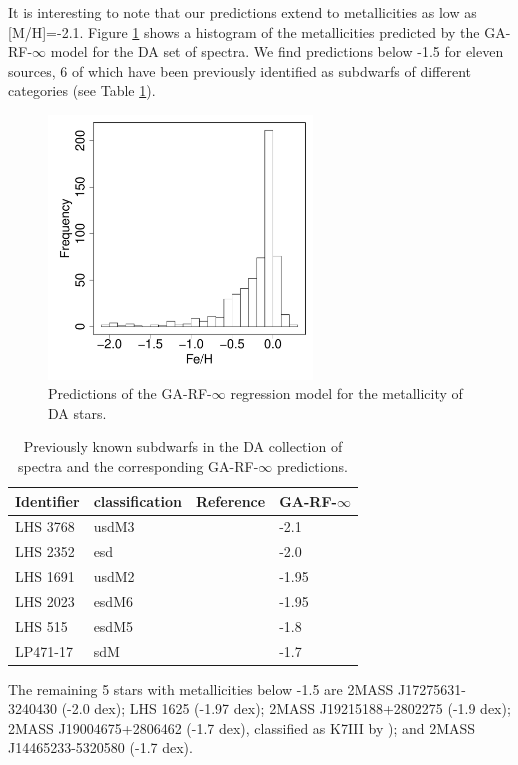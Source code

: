 It is interesting to note that our predictions extend to metallicities
as low as [M/H]=-2.1. Figure \ref{fig:ipac-hist-mets} shows a histogram of
the metallicities predicted by the GA-RF-$\infty$ model for the DA 
set of spectra. We find predictions below -1.5 for eleven sources, 6
of which have been previously identified as subdwarfs of different
categories (see Table \ref{tab:known-sds}).

\begin{figure}
	\begin{center}
		\includegraphics[width=7cm]{figs/ipac-figs/ipac-M-hist}

	\end{center}
        
        \caption{\label{fig:ipac-hist-mets}
Predictions of the GA-RF-$\infty$ regression model
        for the metallicity of DA stars.}

\end{figure}


\begin{table}\centering
	\begin{tabular}{@{}llll@{}}
		\hline
		Identifier & classification & Reference & GA-RF-$\infty$\\
		\hline
		LHS 3768 & usdM3 & \cite{1995AJ....109..797K}  & -2.1 \\
		LHS 2352 & esd   & \cite{1995AJ....109..797K}  & -2.0 \\
		LHS 1691 & usdM2 & \cite{0004-637X-669-2-1235} & -1.95\\
		LHS 2023 & esdM6 & \cite{0004-637X-672-2-1153} & -1.95\\
		LHS 515  & esdM5 & \cite{1538-3873-117-833-676}& -1.8\\
		LP471-17 & sdM   & \cite{1995AJ....109..797K}  & -1.7\\
		\hline
	\end{tabular}
        
	\caption{Previously known subdwarfs in the DA collection of
	spectra and the corresponding GA-RF-$\infty$ predictions.}

\label{tab:known-sds} 
\end{table}

The remaining 5 stars with metallicities below -1.5 are 2MASS
J17275631-3240430 (-2.0 dex); LHS 1625 (-1.97 dex); 2MASS
J19215188+2802275 (-1.9 dex); 2MASS J19004675+2806462 (-1.7 dex),
classified as K7III by \cite{1994ApJS...94..749K}); and 2MASS
J14465233-5320580 (-1.7 dex).

